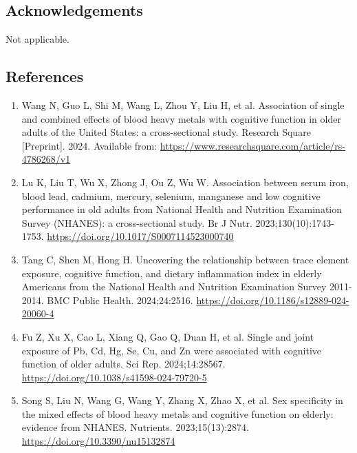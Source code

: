 \documentclass[12pt]{article}
\begin{document}
\subsection*{Acknowledgements}

Not applicable.

\clearpage
\begin{singlespace}
\section*{References}

\begin{enumerate}
\item Wang N, Guo L, Shi M, Wang L, Zhou Y, Liu H, et al. Association of single and combined effects of blood heavy metals with cognitive function in older adults of the United States: a cross-sectional study. Research Square [Preprint]. 2024. Available from: \url{https://www.researchsquare.com/article/rs-4786268/v1}

\item Lu K, Liu T, Wu X, Zhong J, Ou Z, Wu W. Association between serum iron, blood lead, cadmium, mercury, selenium, manganese and low cognitive performance in old adults from National Health and Nutrition Examination Survey (NHANES): a cross-sectional study. Br J Nutr. 2023;130(10):1743-1753. \url{https://doi.org/10.1017/S0007114523000740}

\item Tang C, Shen M, Hong H. Uncovering the relationship between trace element exposure, cognitive function, and dietary inflammation index in elderly Americans from the National Health and Nutrition Examination Survey 2011-2014. BMC Public Health. 2024;24:2516. \url{https://doi.org/10.1186/s12889-024-20060-4}

\item Fu Z, Xu X, Cao L, Xiang Q, Gao Q, Duan H, et al. Single and joint exposure of Pb, Cd, Hg, Se, Cu, and Zn were associated with cognitive function of older adults. Sci Rep. 2024;14:28567. \url{https://doi.org/10.1038/s41598-024-79720-5}

\item Song S, Liu N, Wang G, Wang Y, Zhang X, Zhao X, et al. Sex specificity in the mixed effects of blood heavy metals and cognitive function on elderly: evidence from NHANES. Nutrients. 2023;15(13):2874. \url{https://doi.org/10.3390/nu15132874}


\end{enumerate}
\end{singlespace}
\end{document}
